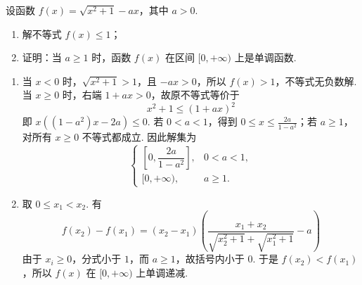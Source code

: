 \begin{problem}
设函数 \(f(x)=\sqrt{x^{2}+1}-ax\)，其中 \(a>0\).

\begin{enumerate}
\item 解不等式 \(f(x)\leqslant1\)；
\item 证明：当 \(a\geqslant1\) 时，函数 \(f(x)\) 在区间 \([0,+\infty)\) 上是单调函数.
\end{enumerate}

\begin{solution}
\begin{enumerate}
\item 当 \(x<0\) 时，\(\sqrt{x^2+1}>1\)，且 \(-ax>0\)，所以 \(f(x)>1\)，不等式无负数解. 当 \(x\geqslant0\) 时，右端 \(1+ax>0\)，故原不等式等价于
\[
x^2+1\leqslant(1+ax)^2
\]
即 \(x((1-a^2)x-2a)\leqslant0\). 若 \(0<a<1\)，得到 \(0\leqslant x\leqslant\frac{2a}{1-a^2}\)；若 \(a\geqslant1\)，对所有 \(x\geqslant0\) 不等式都成立. 因此解集为
\[
\begin{cases}
\left[0,\dfrac{2a}{1-a^2}\right],&0<a<1,\\
[0,+\infty),&a\geqslant1.
\end{cases}
\]
\item 取 \(0\leqslant x_1<x_2\). 有
\[
f(x_2)-f(x_1)=(x_2-x_1)\left(\frac{x_1+x_2}{\sqrt{x_2^2+1}+\sqrt{x_1^2+1}}-a\right)
\]
由于 \(x_i\geqslant0\)，分式小于 \(1\)，而 \(a\geqslant1\)，故括号内小于 \(0\). 于是 \(f(x_2)<f(x_1)\)，所以 \(f(x)\) 在 \([0,+\infty)\) 上单调递减.
\end{enumerate}
\end{solution}
\end{problem}

